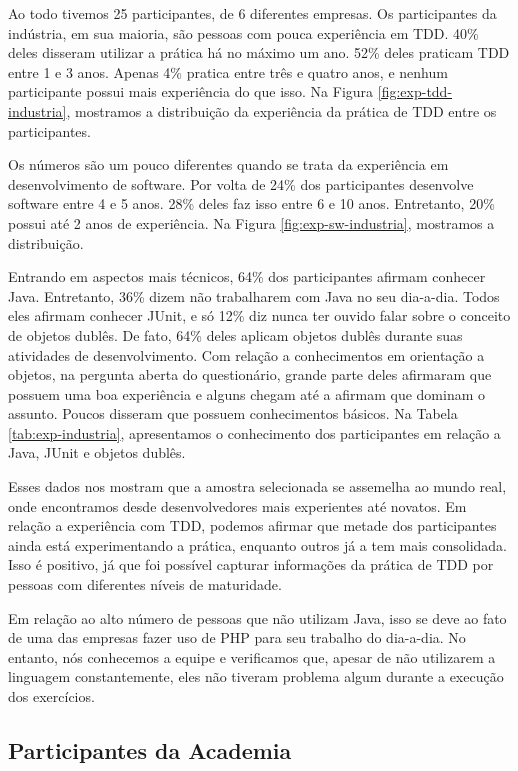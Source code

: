 Ao todo tivemos 25 participantes, de 6 diferentes empresas.
Os participantes da indústria, em sua maioria, são pessoas com pouca experiência em TDD.
40\% deles disseram utilizar a prática há no máximo um ano. 52\% deles praticam TDD
entre 1 e 3 anos. Apenas 4\% pratica entre três e quatro anos, e nenhum participante
possui mais experiência do que isso. Na Figura \ref{fig:exp-tdd-industria}, mostramos
a distribuição da experiência da prática de TDD entre os participantes.

Os números são um pouco diferentes quando se trata da experiência em desenvolvimento
de software. Por volta de 24\% dos participantes desenvolve software entre 4 e 5 anos.
28\% deles faz isso entre 6 e 10 anos. Entretanto, 20\% possui até 2 anos de experiência.
Na Figura \ref{fig:exp-sw-industria}, mostramos a distribuição.

Entrando em aspectos mais técnicos, 64\% dos participantes afirmam conhecer Java. Entretanto,
36\% dizem não trabalharem com Java no seu dia-a-dia. Todos eles afirmam conhecer JUnit,
e só 12\% diz nunca ter ouvido falar sobre o conceito de objetos dublês. De fato, 64\% deles
aplicam objetos dublês durante suas atividades de desenvolvimento. Com relação a conhecimentos
em orientação a objetos, na pergunta aberta do questionário, grande parte deles 
afirmaram que possuem uma boa experiência e alguns
chegam até a afirmam que dominam o assunto. Poucos disseram que possuem conhecimentos
básicos. Na Tabela \ref{tab:exp-industria},
apresentamos o conhecimento dos participantes em relação a Java, JUnit e objetos dublês.

Esses dados nos mostram que a amostra selecionada se assemelha ao mundo real, onde
encontramos desde desenvolvedores mais experientes até novatos. Em relação a experiência com TDD,
podemos afirmar que metade dos participantes ainda está experimentando a prática, enquanto
outros já a tem mais consolidada. Isso é positivo, já que foi possível capturar informações
da prática de TDD por pessoas com diferentes níveis de maturidade.

Em relação ao alto número de pessoas que não utilizam Java, isso se deve ao fato de uma das
empresas fazer uso de PHP para seu trabalho do dia-a-dia. No entanto, nós conhecemos a equipe
e verificamos que, apesar de não utilizarem a linguagem constantemente, eles não tiveram
problema algum durante a execução dos exercícios.

\subsection{Participantes da Academia}
\label{findings-desc-industria}

